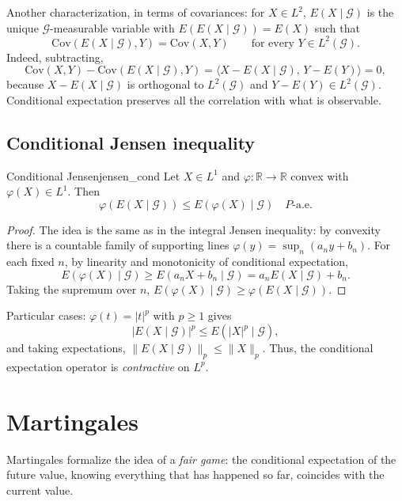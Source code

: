 \documentclass[11pt, a4paper]{article}
\begin{document}
\obs Another characterization, in terms of covariances: for $X \in L^2$,
$E(X \mid \mathcal{G})$ is the unique $\mathcal{G}$-measurable variable with $E(E(X \mid
\mathcal{G})) = E(X)$ such that
$$ \mathrm{Cov}(E(X \mid \mathcal{G}), Y) = \mathrm{Cov}(X, Y) \qquad \text{for every } Y \in
L^2(\mathcal{G}). $$
Indeed, subtracting,
$$ \mathrm{Cov}(X, Y) - \mathrm{Cov}(E(X \mid \mathcal{G}), Y) = \big\langle X - E(X \mid
\mathcal{G}), \, Y - E(Y) \big\rangle = 0, $$
because $X - E(X \mid \mathcal{G})$ is orthogonal to $L^2(\mathcal{G})$ and $Y - E(Y) \in
L^2(\mathcal{G})$. Conditional expectation preserves all the correlation with what is observable.

\subsection{Conditional Jensen inequality}

\begin{teorema}{Conditional Jensen}{jensen_cond}
Let $X \in L^1$ and $\varphi: \mathbb{R} \to \mathbb{R}$ convex with $\varphi(X) \in L^1$. Then
$$ \varphi(E(X \mid \mathcal{G})) \le E(\varphi(X) \mid \mathcal{G}) \quad P\text{-a.e.} $$
\end{teorema}

\begin{proof}
The idea is the same as in the integral Jensen inequality: by convexity there is a countable family of
supporting lines $\varphi(y) = \sup_n (a_n y + b_n)$. For each fixed $n$, by linearity and monotonicity
of conditional expectation,
$$ E(\varphi(X) \mid \mathcal{G}) \ge E(a_n X + b_n \mid \mathcal{G}) = a_n E(X \mid \mathcal{G})
+ b_n. $$
Taking the supremum over $n$, $E(\varphi(X) \mid \mathcal{G}) \ge \varphi(E(X \mid \mathcal{G}))$.
\end{proof}

\obs Particular cases: $\varphi(t) = |t|^p$ with $p \ge 1$ gives
$$ |E(X \mid \mathcal{G})|^p \le E(|X|^p \mid \mathcal{G}), $$
and taking expectations, $\|E(X \mid \mathcal{G})\|_p \le \|X\|_p$. Thus, the conditional expectation
operator is \emph{contractive} on $L^p$.

\newpage

\section{Martingales}

Martingales formalize the idea of a \emph{fair game}: the conditional expectation of the future
value, knowing everything that has happened so far, coincides with the current value.
\end{document}
